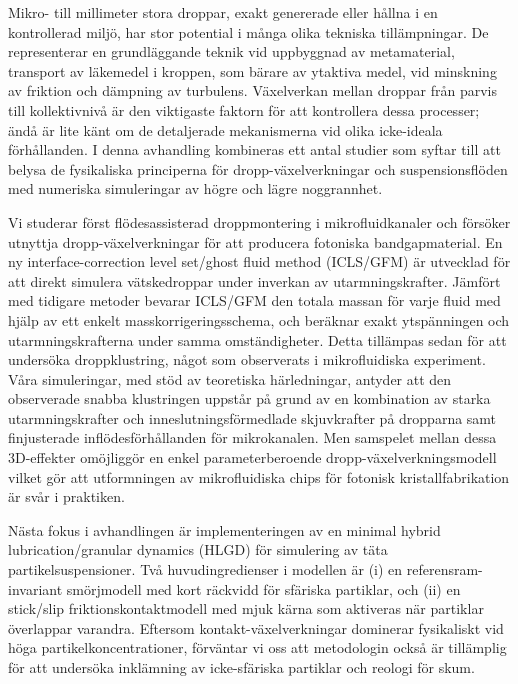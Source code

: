 \begin{abstrakt}
Mikro- till millimeter stora droppar, exakt genererade eller hållna i en kontrollerad miljö, har stor potential i många olika tekniska tillämpningar. De representerar en grundläggande teknik vid uppbyggnad av metamaterial, transport av läkemedel i kroppen, som bärare av ytaktiva medel, vid minskning av friktion och dämpning av turbulens. Växelverkan mellan droppar från parvis till kollektivnivå är den viktigaste faktorn för att kontrollera dessa processer; ändå är lite känt om de detaljerade mekanismerna vid olika icke-ideala förhållanden. I denna avhandling kombineras ett antal studier som syftar till att belysa de fysikaliska principerna för dropp-växelverkningar och suspensionsflöden med numeriska simuleringar av högre och lägre noggrannhet.

Vi studerar först flödesassisterad droppmontering i mikrofluidkanaler och försöker utnyttja dropp-växelverkningar för att producera fotoniska bandgapmaterial. En ny interface-correction level set/ghost fluid method (ICLS/GFM) är utvecklad för att direkt simulera vätskedroppar under inverkan av utarmningskrafter. Jämfört med tidigare metoder bevarar ICLS/GFM den totala massan för varje fluid med hjälp av ett enkelt masskorrigeringsschema, och beräknar exakt ytspänningen och utarmningskrafterna under samma omständigheter. Detta tillämpas sedan för att undersöka droppklustring, något som observerats i mikrofluidiska experiment. Våra simuleringar, med stöd av teoretiska härledningar, antyder att den observerade snabba klustringen uppstår på grund av en kombination av starka utarmningskrafter och inneslutningsförmedlade skjuvkrafter på dropparna samt finjusterade inflödesförhållanden för mikrokanalen. Men samspelet mellan dessa 3D-effekter omöjliggör en enkel parameterberoende dropp-växelverkningsmodell vilket gör att utformningen av mikrofluidiska chips för fotonisk kristallfabrikation är svår i praktiken.

Nästa fokus i avhandlingen är implementeringen av en minimal hybrid lubrication/granular dynamics (HLGD) för simulering av täta partikelsuspensioner. Två huvudingredienser i modellen är (i) en referensram-invariant smörjmodell med kort räckvidd för sfäriska partiklar, och (ii) en stick/slip friktionskontaktmodell med mjuk kärna som aktiveras när partiklar överlappar varandra. Eftersom kontakt-växelverkningar dominerar fysikaliskt vid höga partikelkoncentrationer, förväntar vi oss att metodologin också är tillämplig för att undersöka inklämning av icke-sfäriska partiklar och reologi för skum.


\end{abstrakt}
